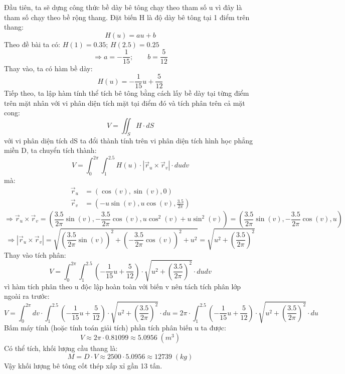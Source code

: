 Đầu tiên, ta sẽ dựng công thức bề dày bê tông chạy theo tham số u vì đây là tham số chạy theo bề rộng thang. Đặt biến H là độ dày bê tông tại 1 điểm trên thang:
\begin{equation}
	H(u)=au+b
\end{equation}
Theo đề bài ta có: $H(1)=0.35$; $H(2.5)=0.25$
\[
\Rightarrow a=-\frac{1}{15}; \qquad b=\frac{5}{12}
\]
Thay vào, ta có hàm bề dày:
\begin{equation}
	H(u)=-\frac{1}{15}u+\frac{5}{12}
\end{equation}
Tiếp theo, ta lập hàm tính thể tích bê tông bằng cách lấy bề dày tại từng điểm trên mặt nhân với vi phân diện tích mặt tại điểm đó và tích phân trên cả mặt cong:
\begin{equation}
	V=\iint_{S} H \cdot dS
\end{equation}
với vi phân diện tích dS ta đổi thành tính trên vi phân diện tích hình học phẳng miền D, ta chuyển tích thành:
\begin{equation}
	V=\int_{0}^{2\pi}\int_{1}^{2.5}H(u) \cdot |\vec{r}_{u}\times\vec{r}_{v}| \cdot dudv
\end{equation}
mà:
\begin{align}
	\vec{r}_{u} &= (\cos(v), \sin(v), 0) \\
	\vec{r}_{v} &= \left(-u\sin(v), u\cos(v), \frac{3.5}{2\pi}\right)
\end{align}
\begin{equation}
	\Rightarrow \vec{r}_{u}\times\vec{r}_{v} = \left(\frac{3.5}{2\pi}\sin(v), -\frac{3.5}{2\pi}\cos(v), u\cos^2(v)+u\sin^2(v)\right) = \left(\frac{3.5}{2\pi}\sin(v), -\frac{3.5}{2\pi}\cos(v), u\right)
\end{equation}
\begin{equation}
	\Rightarrow |\vec{r}_{u}\times\vec{r}_{v}| = \sqrt{\left(\frac{3.5}{2\pi}\sin(v)\right)^2 + \left(-\frac{3.5}{2\pi}\cos(v)\right)^2 + u^2} = \sqrt{u^2 + \left(\frac{3.5}{2\pi}\right)^2}
\end{equation}
Thay vào tích phân:
\begin{equation}
	V = \int_{0}^{2\pi}\int_{1}^{2.5} \left(-\frac{1}{15}u+\frac{5}{12}\right) \cdot \sqrt{u^2 + \left(\frac{3.5}{2\pi}\right)^2} \cdot dudv
\end{equation}
vì hàm tích phân theo u độc lập hoàn toàn với biến v nên tách tích phân lớp ngoài ra trước:
\begin{equation}
	V = \int_{0}^{2\pi}dv \cdot \int_{1}^{2.5} \left(-\frac{1}{15}u+\frac{5}{12}\right) \cdot \sqrt{u^2 + \left(\frac{3.5}{2\pi}\right)^2} \cdot du = 2\pi \cdot \int_{1}^{2.5} \left(-\frac{1}{15}u+\frac{5}{12}\right) \cdot \sqrt{u^2 + \left(\frac{3.5}{2\pi}\right)^2} \cdot du
\end{equation}
Bấm máy tính (hoặc tính toán giải tích) phần tích phân biến u ta được:
\begin{equation}
	V \approx 2\pi \cdot 0.81099 \approx 5.0956 \; (m^3)
\end{equation}
Có thể tích, khối lượng cầu thang là:
\begin{equation}
	M = D \cdot V \approx 2500 \cdot 5.0956 \approx 12739 \; (kg)
\end{equation}
Vậy khối lượng bê tông cốt thép xấp xỉ gần 13 tấn.


